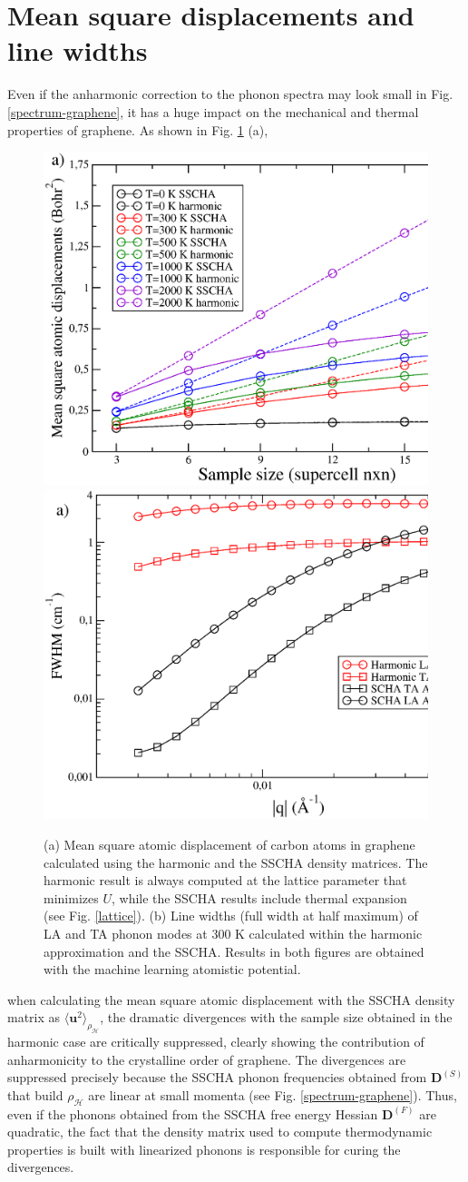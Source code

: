 \section{Mean square displacements and line widths}

Even if the anharmonic correction to the phonon spectra may look small in Fig. \ref{spectrum-graphene}, it has a 
huge impact on the mechanical and thermal properties of graphene. As shown in Fig. \ref{problems} (a), 
\begin{figure}[ht]
\includegraphics[width=0.49\linewidth]{Figures/rms.eps}
\includegraphics[width=0.49\linewidth]{Figures/lw-graphene.eps}
\caption[SSCHA mean square atomic displacements and line widths]{(a) Mean square atomic displacement of carbon atoms 
	in graphene calculated using the harmonic and the SSCHA density matrices. The harmonic result is always 
	computed at the lattice parameter that minimizes $U$, while the SSCHA results include thermal expansion (see 
	Fig. \ref{lattice}). (b) Line widths (full width at half maximum) of LA and TA phonon modes at $300$ K 
	calculated within the harmonic approximation and the SSCHA. Results in both figures are obtained with the 
	machine learning atomistic potential.}
\label{problems}
\end{figure}
when calculating the mean square atomic displacement with the SSCHA density matrix as 
$\langle \mathbf{u}^2 \rangle_{\rho_{\mathcal{H}}}$, the dramatic divergences with the sample size obtained in the 
harmonic case are critically suppressed, clearly showing the contribution of anharmonicity to the crystalline order 
of graphene. The divergences are suppressed precisely because the SSCHA phonon frequencies obtained from 
$\boldsymbol{D}^{(S)}$ that build $\rho_{\mathcal{H}}$ are linear at small momenta (see 
Fig. \ref{spectrum-graphene}). Thus, even if the phonons obtained from the SSCHA free energy Hessian 
$\boldsymbol{D}^{(F)}$ are quadratic, the fact that the density matrix used to compute thermodynamic properties is 
built with linearized phonons is responsible for curing the divergences. \\

